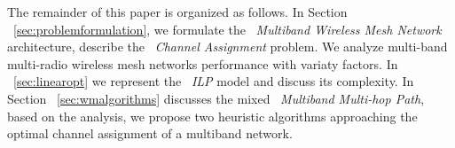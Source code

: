 The remainder of this paper is organized as follows. In Section ~\ref{sec:problemformulation}, we formulate the ~\emph{Multiband Wireless Mesh Network} architecture, describe the ~\emph{Channel Assignment} problem. We analyze multi-band multi-radio wireless mesh networks performance with variaty factors. 
In ~\ref{sec:linearopt} we represent the ~\emph{ILP} model and discuss its complexity.
In Section ~\ref{sec:wmalgorithms} discusses the mixed ~\emph{Multiband Multi-hop Path}, based on the analysis, we propose two heuristic algorithms approaching the optimal channel assignment of a multiband network. 

